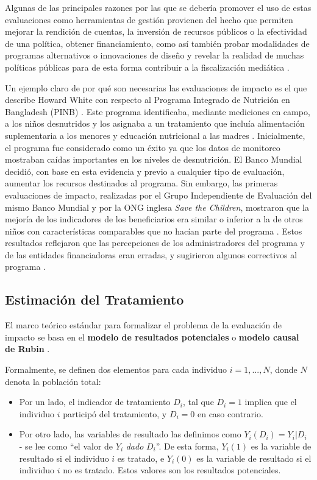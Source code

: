 \documentclass[../../main.tex]{subfiles}
\begin{document}
Algunas de las principales razones por las que se debería promover el uso de estas evaluaciones como herramientas de gestión provienen del hecho que permiten mejorar la rendición de cuentas, la inversión de recursos públicos o la efectividad de una política, obtener financiamiento, como así también probar modalidades de programas alternativos o innovaciones de diseño \cite{gertler-2016} y revelar la realidad de muchas políticas públicas para de esta forma contribuir a la fiscalización mediática \cite{bernal}.

Un ejemplo claro de por qué son necesarias las evaluaciones de impacto es el que describe Howard White con respecto al Programa Integrado de Nutrición en Bangladesh (PINB) \cite{white2009theory}. Este programa identificaba, mediante mediciones en campo, a los niños desnutridos y los asignaba a un tratamiento que incluía alimentación suplementaria a los menores y educación nutricional a las madres \cite{bernal}. Inicialmente, el programa fue considerado como un éxito ya que los datos de monitoreo mostraban caídas importantes en los niveles de desnutrición. El Banco Mundial decidió, con base en esta evidencia y previo a cualquier tipo de evaluación, aumentar los recursos destinados al programa. Sin embargo, las primeras evaluaciones de impacto, realizadas por el Grupo Independiente de Evaluación del mismo Banco Mundial y por la ONG inglesa \textit{Save the Children}, mostraron que la mejoría de los indicadores de los beneficiarios era similar o inferior a la de otros niños con características comparables que no hacían parte del programa \cite{bernal}. Estos resultados reflejaron que las percepciones de los administradores del programa y de las entidades financiadoras eran erradas, y sugirieron algunos correctivos al programa \cite{bernal}.

\subsection{Estimación del Tratamiento}
El marco teórico estándar para formalizar el problema de la evaluación de impacto se basa en el \textbf{modelo de resultados potenciales} o \textbf{modelo causal de Rubin} \cite{rubin1974}. 

Formalmente, se definen dos elementos para cada individuo \(i = 1,...,N\), donde \(N\) denota la población total:
\begin{itemize}
    \item Por un lado, el indicador de tratamiento \(D_i\), tal que \(D_i = 1\) implica que el individuo \(i\) participó del tratamiento, y \(D_i = 0\) en caso contrario.
    \item Por otro lado, las variables de resultado las definimos como \(Y_i(D_i) = Y_i|D_i\) - se lee como ``el valor de \(Y_i\) \textit{dado} \(D_i\)''. De esta forma, \(Y_i(1)\) es la variable de resultado si el individuo \(i\) es tratado, e \(Y_i(0)\) es la variable de resultado si el individuo \(i\) no es tratado. Estos valores son los resultados potenciales.
\end{itemize}
\end{document}
